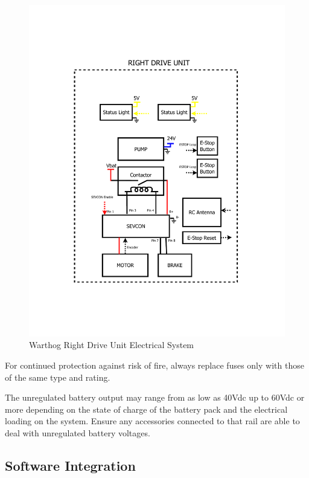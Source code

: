 \documentclass[]{clearpath-latex/clearpath-manual}
\begin{document}
\begin{figure}[!h]
  \centering
  \includegraphics[width=1.0\linewidth]{elec-right.pdf}
  \caption{Warthog Right Drive Unit Electrical System}
  \label{elec-right}
\end{figure}

\begin{warning}
For continued protection against risk of fire, always replace fuses only with those of the same type and rating.
\end{warning}

\begin{warning}
The unregulated battery output may range from as low as 40Vdc up to 60Vdc or more depending on the state of charge of the battery pack and the electrical loading on the system. Ensure any accessories connected to that rail are able to deal with unregulated battery voltages.
\end{warning}


\subsection{Software Integration}
\end{document}
